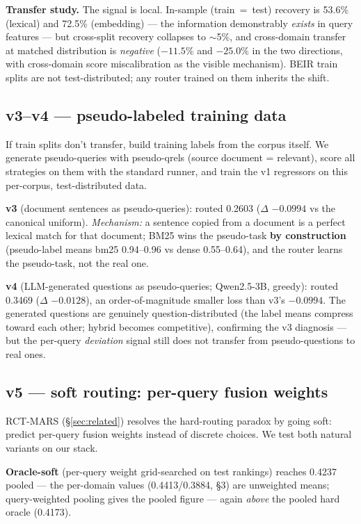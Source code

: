 \documentclass[11pt]{article}
\begin{document}
\textbf{Transfer study.} The signal is local. In-sample (train~=~test) recovery is 53.6\% (lexical) and 72.5\% (embedding) --- the information demonstrably \emph{exists} in query features --- but cross-split recovery collapses to $\sim$5\%, and cross-domain transfer at matched distribution is \emph{negative} ($-11.5\%$ and $-25.0\%$ in the two directions, with cross-domain score miscalibration as the visible mechanism). BEIR train splits are not test-distributed; any router trained on them inherits the shift.

\subsection{v3--v4 --- pseudo-labeled training data}
If train splits don't transfer, build training labels from the corpus itself. We generate pseudo-queries with pseudo-qrels (source document = relevant), score all strategies on them with the standard runner, and train the v1 regressors on this per-corpus, test-distributed data.

\textbf{v3} (document sentences as pseudo-queries): routed 0.2603 ($\Delta$ $-0.0994$ vs the canonical uniform). \emph{Mechanism:} a sentence copied from a document is a perfect lexical match for that document; BM25 wins the pseudo-task \textbf{by construction} (pseudo-label means bm25 0.94--0.96 vs dense 0.55--0.64), and the router learns the pseudo-task, not the real one.

\textbf{v4} (LLM-generated questions as pseudo-queries; Qwen2.5-3B, greedy): routed 0.3469 ($\Delta$ $-0.0128$), an order-of-magnitude smaller loss than v3's $-0.0994$. The generated questions are genuinely question-distributed (the label means compress toward each other; hybrid becomes competitive), confirming the v3 diagnosis --- but the per-query \emph{deviation} signal still does not transfer from pseudo-questions to real ones.

\subsection{v5 --- soft routing: per-query fusion weights}\label{sec:v5}
RCT-MARS (\S\ref{sec:related}) resolves the hard-routing paradox by going soft: predict per-query fusion weights instead of discrete choices. We test both natural variants on our stack.

\textbf{Oracle-soft} (per-query weight grid-searched on test rankings) reaches 0.4237 pooled --- the per-domain values (0.4413/0.3884, \S3) are unweighted means; query-weighted pooling gives the pooled figure --- again \emph{above} the pooled hard oracle (0.4173).
\end{document}
